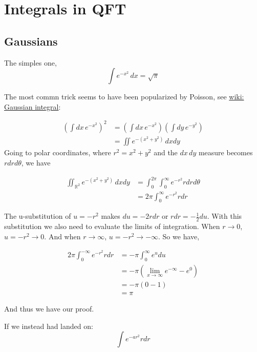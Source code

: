 \section{Integrals in QFT}



\subsection{Gaussians}

The simples one,
$$
\int e^{-x^2} \, dx = \sqrt{\pi}
$$

The most commn trick seems to have been popularized by Poisson, see
\href{https://en.wikipedia.org/wiki/Gaussian_integral}{wiki: Gaussian integral}:

\begin{align*}
\left( \int dx \, e^{-x^2} \right)^2 &= \left( \int dx \, e^{-x^2} \right) \left( \int dy \, e^{-y^2} \right) \\
&= \iint e^{-\left(x^2 + y^2\right)} \, dx dy
\end{align*}
Going to polar coordinates, where $r^2 = x^2 + y^2$ and the $dx \, dy$ measure becomes $r dr d\theta$, we have

\begin{align*}
\iint_{\mathbb{R}^2} e^{-\left(x^2 + y^2\right)} \, dx dy &=
    \int_{0}^{2\pi} \int_{0}^{\infty} e^{-r^2} r dr d\theta \\
&= 2\pi \int_{0}^{\infty} e^{-r^2} r dr
\end{align*}

The u-substitution of $u = -r^2$ makes $du = -2r dr$ or $r dr = -\frac{1}{2} du$.
With this substitution we also need to evaluate the limits of integration.
When $r \rightarrow 0$, $u = -r^2 \rightarrow 0$.
And when $r \rightarrow \infty$, $u = -r^2 \rightarrow -\infty$.
So we have,

\begin{align*}
2\pi \int_{0}^{-\infty} e^{-r^2} r dr &= -\pi \int_{0}^{\infty} e^{u} du \\
&= -\pi \left( \lim_{x\rightarrow \infty} e^{-\infty} - e^0 \right) \\
&= -\pi \left( 0 - 1  \right) \\
&= \pi
\end{align*}

And thus we have our proof.

If we instead had landed on:
$$
\int e^{-ar^2} r dr
$$

